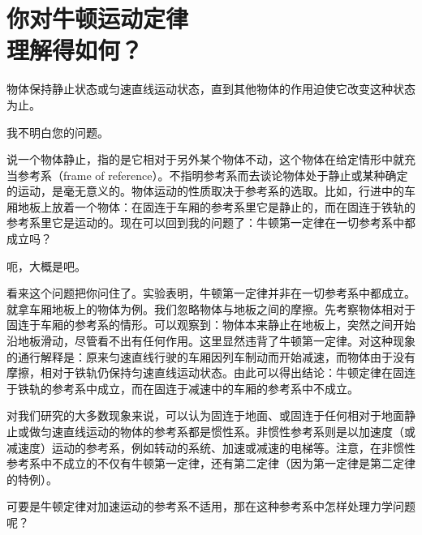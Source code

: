 
\chapter[你对牛顿运动定律理解得如何？]{你对牛顿运动定律\\理解得如何？\label{ch-04}}

\begin{dialogue}
\tchr {}

\std 物体保持静止状态或匀速直线运动状态，直到其他物体的作用迫使它改变这种状态为止。

\tchr {}

\std 我不明白您的问题。

\tchr 说一个物体静止，指的是它相对于另外某个物体不动，这个物体在给定情形中就充当参考系（frame of reference）。不指明参考系而去谈论物体处于静止或某种确定的运动，是毫无意义的。物体运动的性质取决于参考系的选取。比如，行进中的车厢地板上放着一个物体：在固连于车厢的参考系里它是静止的，而在固连于铁轨的参考系里它是运动的。现在可以回到我的问题了：牛顿第一定律在一切参考系中都成立吗？

\std 呃，大概是吧。

\tchr 看来这个问题把你问住了。实验表明，牛顿第一定律并非在一切参考系中都成立。就拿车厢地板上的物体为例。我们忽略物体与地板之间的摩擦。先考察物体相对于固连于车厢的参考系的情形。可以观察到：物体本来静止在地板上，突然之间开始沿地板滑动，尽管看不出有任何作用。这里显然违背了牛顿第一定律。对这种现象的通行解释是：原来匀速直线行驶的车厢因列车制动而开始减速，而物体由于没有摩擦，相对于铁轨仍保持匀速直线运动状态。由此可以得出结论：牛顿定律在固连于铁轨的参考系中成立，而在固连于减速中的车厢的参考系中不成立。

对我们研究的大多数现象来说，可以认为固连于地面、或固连于任何相对于地面静止或做匀速直线运动的物体的参考系都是惯性系。非惯性参考系则是以加速度（或减速度）运动的参考系，例如转动的系统、加速或减速的电梯等。注意，在非惯性参考系中不成立的不仅有牛顿第一定律，还有第二定律（因为第一定律是第二定律的特例）。

\std 可要是牛顿定律对加速运动的参考系不适用，那在这种参考系中怎样处理力学问题呢？


\end{dialogue}
